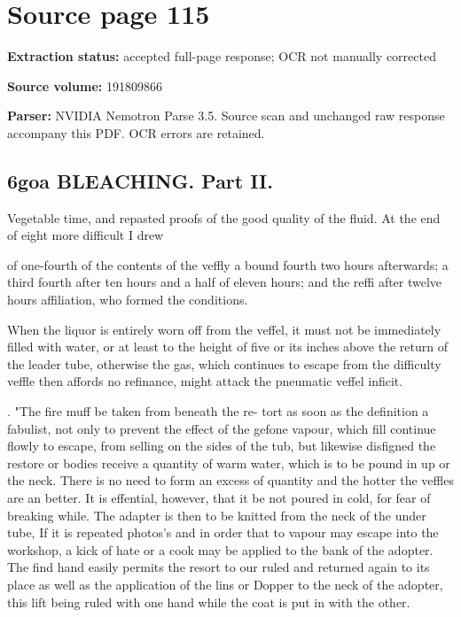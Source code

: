 \clearpage
\section{Source page 115}
\textbf{Extraction status:} accepted full-page response; OCR not manually corrected\par
\textbf{Source volume:} 191809866\par
\textbf{Parser:} NVIDIA Nemotron Parse 3.5. Source scan and unchanged raw response accompany this PDF. OCR errors are retained.\par\medskip
\subsection*{6goa BLEACHING. Part II.}
Vegetable time, and repasted proofs of the good quality of the
fluid. At the end of eight more difficult I drew\par\medskip
of one-fourth of the contents of the veffly a bound
fourth two hours afterwards; a third fourth after ten
hours and a half of eleven hours; and the reffi after
twelve hours affiliation, who formed the conditions.\par\medskip
When the liquor is entirely worn off from the
veffel, it must not be immediately filled with water, or at least to the height of five or its inches above the
return of the leader tube, otherwise the gas, which
continues to escape from the difficulty veffle then
affords no refinance, might attack the pneumatic veffel
inficit.\par{}. "The fire muff be taken from beneath the re-
tort as soon as the definition a fabulist, not only to
prevent the effect of the gefone vapour, which fill
continue flowly to escape, from selling on the sides of
the tub, but likewise disfigned the restore or bodies
receive a quantity of warm water, which is to be
pound in up or the neck. There is no need to form
an excess of quantity and the hotter the veffles are an
better. It is effential, however, that it be not poured
in cold, for fear of breaking while. The adapter
is then to be knitted from the neck of the under tube,
If it is repeated photos’s and in order that to vapour
may escape into the workshop, a kick of hate or a cook
may be applied to the bank of the adopter. The find
hand easily permits the resort to our ruled and returned
again to its place as well as the application of the lins
or Dopper to the neck of the adopter, this lift being
ruled with one hand while the coat is put in with the
other.\par\medskip
